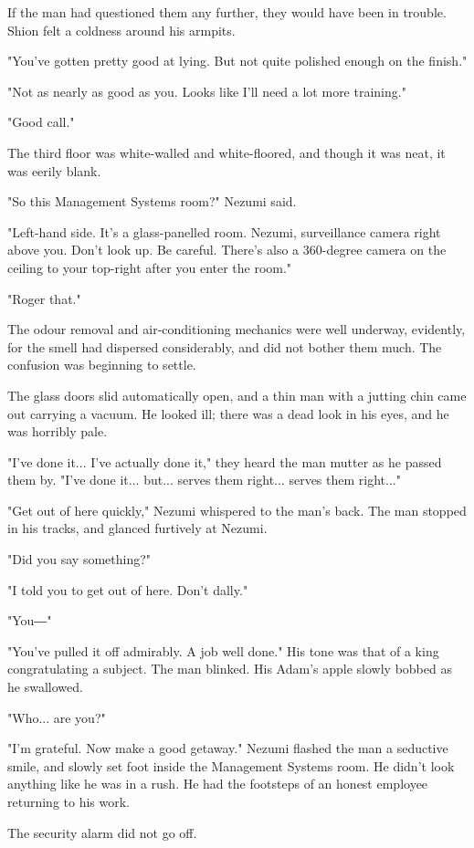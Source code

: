 If the man had questioned them any further, they would have been in
trouble. Shion felt a coldness around his armpits.

"You've gotten pretty good at lying. But not quite polished enough on
the finish."

"Not as nearly as good as you. Looks like I'll need a lot more
training."

"Good call."

The third floor was white-walled and white-floored, and though it was
neat, it was eerily blank.

"So this Management Systems room?" Nezumi said.

"Left-hand side. It's a glass-panelled room. Nezumi, surveillance camera
right above you. Don't look up. Be careful. There's also a 360-degree
camera on the ceiling to your top-right after you enter the room."

"Roger that."

The odour removal and air-conditioning mechanics were well underway,
evidently, for the smell had dispersed considerably, and did not bother
them much. The confusion was beginning to settle.

The glass doors slid automatically open, and a thin man with a jutting
chin came out carrying a vacuum. He looked ill; there was a dead look in
his eyes, and he was horribly pale.

"I've done it... I've actually done it," they heard the man mutter as he
passed them by. "I've done it... but... serves them right... serves them
right..."

"Get out of here quickly," Nezumi whispered to the man's back. The man
stopped in his tracks, and glanced furtively at Nezumi.

"Did you say something?"

"I told you to get out of here. Don't dally."

"You―"

"You've pulled it off admirably. A job well done." His tone was that of
a king congratulating a subject. The man blinked. His Adam's apple
slowly bobbed as he swallowed.

"Who... are you?"

"I'm grateful. Now make a good getaway." Nezumi flashed the man a
seductive smile, and slowly set foot inside the Management Systems room.
He didn't look anything like he was in a rush. He had the footsteps of
an honest employee returning to his work.

The security alarm did not go off.

